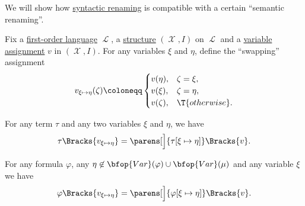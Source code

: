 \begin{proposition}\label{thm:swapping_assignment_compatibility}
  We will show how \hyperref[rem:first_order_substitution_renaming_justification]{syntactic renaming} is compatible with a certain \enquote{semantic renaming}.

  Fix a \hyperref[def:first_order_syntax]{first-order language} \( \mscrL \), a \hyperref[def:first_order_structure]{structure} \( (\mscrX, I) \) on \( \mscrL \) and a \hyperref[def:first_order_valuation/variable_assignment]{variable assignment} \( v \) in \( (\mscrX, I) \). For any variables \( \xi \) and \( \eta \), define the \enquote{swapping} assignment
  \begin{equation}\label{eq:thm:swapping_assignment_compatibility/swapping_assignment}
    v_{\xi \mapsto \eta}(\zeta) \coloneqq \begin{cases}
      v(\eta),  &\zeta = \xi, \\
      v(\xi),   &\zeta = \eta, \\
      v(\zeta), &\T{otherwise}.
    \end{cases}
  \end{equation}

  \begin{propenum}
     For any term \( \tau \) and any two variables \( \xi \) and \( \eta \), we have
    \begin{equation}\label{eq:thm:swapping_assignment_compatibility/terms}
      \tau\Bracks{v_{\xi \mapsto \eta}}
      =
      \parens[\Big]{ \tau[\xi \mapsto \eta] }\Bracks{v}.
    \end{equation}

     For any formula \( \varphi \), any \( \eta \not\in \bfop{Var}(\varphi) \cup \bfop{Var}(\mu) \) and any variable \( \xi \) we have
    \begin{equation}\label{eq:thm:swapping_assignment_compatibility/formulas}
      \varphi\Bracks{v_{\xi \mapsto \eta}}
      =
      \parens[\Big]{ \varphi[\xi \mapsto \eta] }\Bracks{v}.
    \end{equation}
  \end{propenum}
\end{proposition}
